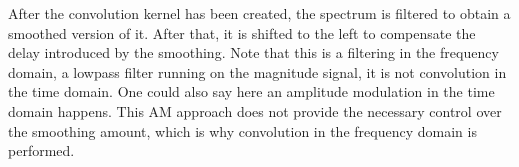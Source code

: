 
    After the convolution kernel has been created, the spectrum is filtered to obtain a smoothed version of it. After that, it is shifted to the left to compensate the delay introduced by the smoothing. Note that this is a filtering in the frequency domain, a lowpass filter running on the magnitude signal, it is not convolution in the time domain. One could also say here an amplitude modulation in the time domain happens. This AM approach does not provide the necessary control over the smoothing amount, which is why convolution in the frequency domain is performed.

